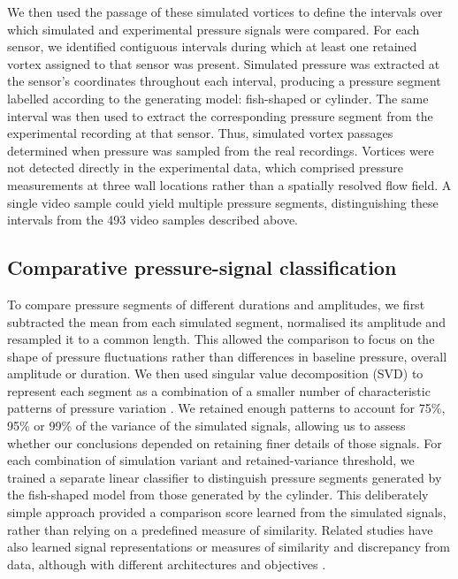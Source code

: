 \documentclass[openacc]{rsproca_new}
\begin{document}
We then used the passage of these simulated vortices to define the intervals over which simulated and experimental pressure signals were compared. For each sensor, we identified contiguous intervals during which at least one retained vortex assigned to that sensor was present. Simulated pressure was extracted at the sensor's coordinates throughout each interval, producing a pressure segment labelled according to the generating model: fish-shaped or cylinder. The same interval was then used to extract the corresponding pressure segment from the experimental recording at that sensor. Thus, simulated vortex passages determined when pressure was sampled from the real recordings. Vortices were not detected directly in the experimental data, which comprised pressure measurements at three wall locations rather than a spatially resolved flow field. A single video sample could yield multiple pressure segments, distinguishing these intervals from the 493 video samples described above.

\subsection{Comparative pressure-signal classification}

To compare pressure segments of different durations and amplitudes, we first subtracted the mean from each simulated segment, normalised its amplitude and resampled it to a common length. This allowed the comparison to focus on the shape of pressure fluctuations rather than differences in baseline pressure, overall amplitude or duration. We then used singular value decomposition (SVD) to represent each segment as a combination of a smaller number of characteristic patterns of pressure variation \cite{klema1980}. We retained enough patterns to account for 75\%, 95\% or 99\% of the variance of the simulated signals, allowing us to assess whether our conclusions depended on retaining finer details of those signals. For each combination of simulation variant and retained-variance threshold, we trained a separate linear classifier to distinguish pressure segments generated by the fish-shaped model from those generated by the cylinder. This deliberately simple approach provided a comparison score learned from the simulated signals, rather than relying on a predefined measure of similarity. Related studies have also learned signal representations or measures of similarity and discrepancy from data, although with different architectures and objectives \cite{hadsell2006,pacchiardi2021,tkachev2021}.
\end{document}
